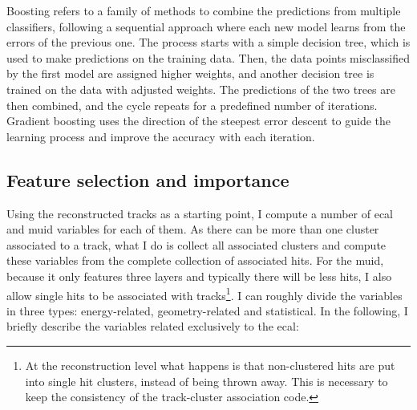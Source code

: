 Boosting refers to a family of methods to combine the predictions from multiple classifiers, following a sequential approach where each new model learns from the errors of the previous one. The process starts with a simple decision tree, which is used to make predictions on the training data. Then, the data points misclassified by the first model are assigned higher weights, and another decision tree is trained on the data with adjusted weights. The predictions of the two trees are then combined, and the cycle repeats for a predefined number of iterations. Gradient boosting uses the direction of the steepest error descent to guide the learning process and improve the accuracy with each iteration.

\subsection{Feature selection and importance}

Using the reconstructed tracks as a starting point, I compute a number of \gls{ecal} and \gls{muid} variables for each of them. As there can be more than one cluster associated to a track, what I do is collect all associated clusters and compute these variables from the complete collection of associated hits. For the \gls{muid}, because it only features three layers and typically there will be less hits, I also allow single hits to be associated with tracks\footnote{At the reconstruction level what happens is that non-clustered hits are put into single hit clusters, instead of being thrown away. This is necessary to keep the consistency of the track-cluster association code.}. I can roughly divide the variables in three types: energy-related, geometry-related and statistical. In the following, I briefly describe the variables related exclusively to the \gls{ecal}:

